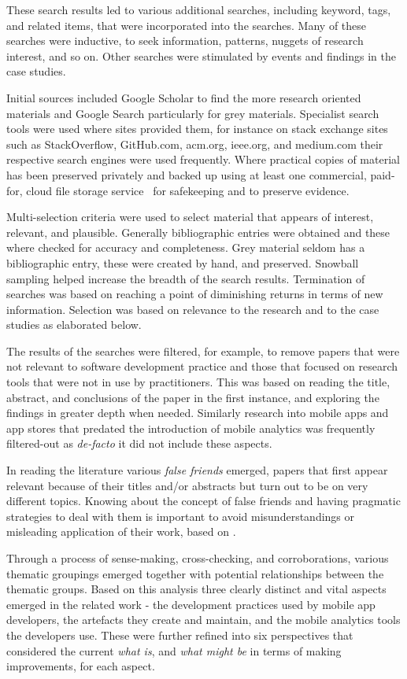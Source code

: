 These search results led to various additional searches, including keyword, tags, and related items, that were incorporated into the searches. Many of these searches were inductive, to seek information, patterns, nuggets of research interest, and so on. Other searches were stimulated by events and findings in the case studies.

Initial sources included Google Scholar to find the more research oriented materials and Google Search particularly for grey materials. Specialist search tools were used where sites provided them, for instance on stack exchange sites such as StackOverflow, GitHub.com, acm.org, ieee.org, and medium.com their respective search engines were used frequently. Where practical copies of material has been preserved privately and backed up using at least one commercial, paid-for, cloud file storage service~ for safekeeping and to preserve evidence.

Multi-selection criteria were used to select material that appears of interest, relevant, and plausible. Generally bibliographic entries were obtained and these where checked for accuracy and completeness. Grey material seldom has a bibliographic entry, these were created by hand, and preserved. Snowball sampling helped increase the breadth of the search results. Termination of searches was based on reaching a point of diminishing returns in terms of new information. Selection was based on relevance to the research and to the case studies as elaborated below.

The results of the searches were filtered, for example, to remove papers that were not relevant to software development practice and those that focused on research tools that were not in use by practitioners. This was based on reading the title, abstract, and conclusions of the paper in the first instance, and exploring the findings in greater depth when needed. Similarly research into mobile apps and app stores that predated the introduction of mobile analytics was frequently filtered-out as \emph{de-facto} it did not include these aspects.

In reading the literature various \textit{false friends} emerged, papers that first appear relevant because of their titles and/or abstracts but turn out to be on very different topics. 
Knowing about the concept of false friends and having pragmatic strategies to deal with them is important to avoid misunderstandings or misleading application of their work, 
based on . 

Through a process of sense-making, cross-checking, and corroborations, various thematic groupings emerged together with potential relationships between the thematic groups. Based on this analysis three clearly distinct and vital aspects emerged in the related work - the development practices used by mobile app developers, the artefacts they create and maintain, and the mobile analytics tools the developers use. These were further refined into six perspectives that considered the current \emph{what is}, and \emph{what might be} in terms of making improvements, for each aspect. 

